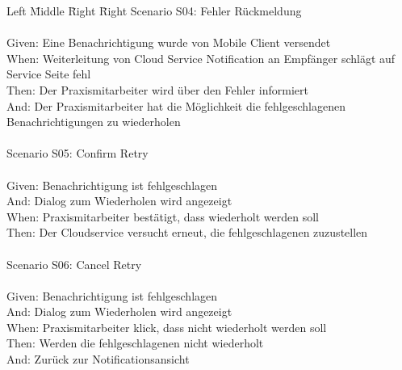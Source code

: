 \begin{tabbing}
    Left \= Middle \= Right \= Right  \kill
    Scenario S04: \> \> \>  Fehler Rückmeldung\\ \\
    Given: \> \> \>   Eine Benachrichtigung wurde von Mobile Client versendet\\
    When: \> \> \>    Weiterleitung von Cloud Service Notification an Empfänger schlägt auf Service Seite fehl\\
    Then: \> \> \>    Der Praxismitarbeiter wird über den Fehler informiert\\
    And: \> \> \>     Der Praxismitarbeiter hat die Möglichkeit die fehlgeschlagenen Benachrichtigungen zu wiederholen\\
    \\
    Scenario S05: \> \> \>  Confirm Retry\\ \\
    Given: \> \> \>   Benachrichtigung ist fehlgeschlagen\\
    And: \> \> \>     Dialog zum Wiederholen wird angezeigt\\
    When: \> \> \>    Praxismitarbeiter bestätigt, dass wiederholt werden soll\\
    Then: \> \> \>    Der Cloudservice versucht erneut, die fehlgeschlagenen zuzustellen\\
    \\
    Scenario S06: \> \> \>  Cancel Retry\\ \\
    Given: \> \> \>   Benachrichtigung ist fehlgeschlagen\\
    And: \> \> \>     Dialog zum Wiederholen wird angezeigt\\
    When: \> \> \>    Praxismitarbeiter klick, dass nicht wiederholt werden soll\\
    Then: \> \> \>    Werden die fehlgeschlagenen nicht wiederholt\\
    And: \> \> \>     Zurück zur Notificationsansicht\\

\end{tabbing}

